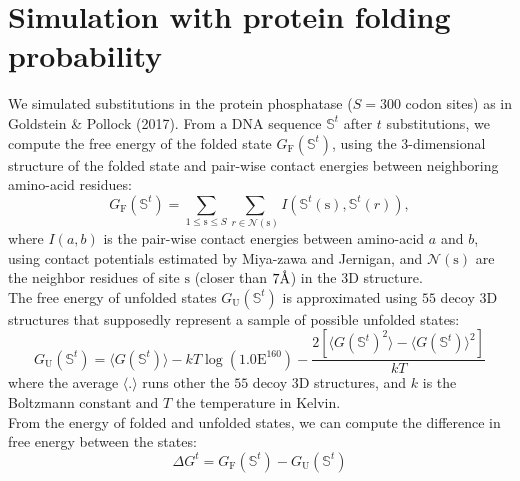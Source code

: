 \documentclass{article}
\newcommand{\angstrom}{\text{\normalfont\AA}}
\newcommand{\Nsite}{S}
\newcommand{\site}{\text{s}}
\begin{document}
\section{Simulation with protein folding probability}
We simulated substitutions in the protein phosphatase ($\Nsite=300$ codon sites) as in Goldstein \& Pollock (2017).
From a DNA sequence $\mathbb{S}^t$ after $t$ substitutions, we compute the free energy of the folded state $G_{\mathrm{F}}(\mathbb{S}^t)$, using the $3$-dimensional structure of the folded state and pair-wise contact energies between neighboring amino-acid residues:
\begin{equation}
G_{\mathrm{F}}(\mathbb{S}^t) = \sum_{1 \leq \site \leq \Nsite} \sum_{r \in \mathcal{N}(\site)} I \left(\mathbb{S}^t(\site), \mathbb{S}^t(r)  \right),
\end{equation}
where $I(a,b)$ is the pair-wise contact energies between amino-acid $a$ and $b$, using contact potentials estimated by Miya-zawa and Jernigan, and $\mathcal{N}(\site)$ are the neighbor residues of site $\site$ (closer than $7\angstrom$) in the $3$D structure.\\

The free energy of unfolded states $G_{\mathrm{U}}(\mathbb{S}^t)$ is approximated using $55$ decoy $3$D structures that supposedly represent a sample of possible unfolded states:
\begin{equation}
G_{\mathrm{U}}(\mathbb{S}^t) = \langle G(\mathbb{S}^t) \rangle - kT \log (1.0\mathrm{E}^{160}) - \dfrac{2 \left[ \langle G(\mathbb{S}^t)^2 \rangle - \langle G(\mathbb{S}^t) \rangle^2\right] }{kT}
\end{equation}
where the average $\langle . \rangle$ runs other the $55$ decoy $3$D structures, and $k$ is the Boltzmann constant and $T$ the temperature in Kelvin.\\

From the energy of folded and unfolded states, we can compute the difference in free energy between the states:
\begin{equation}
\Delta G^t = G_{\mathrm{F}}(\mathbb{S}^t) - G_{\mathrm{U}}(\mathbb{S}^t)
\end{equation}
\end{document}
